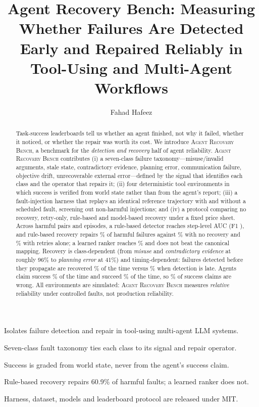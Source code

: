 \documentclass[review,12pt]{elsarticle}
\newcommand{\arb}{\textsc{Agent Recovery Bench}}
\begin{document}
\begin{frontmatter}

\title{Agent Recovery Bench: Measuring Whether Failures Are Detected Early and
Repaired Reliably in Tool-Using and Multi-Agent Workflows}

\author[ncl]{Fahad Hafeez}

\begin{abstract}
Task-success leaderboards tell us whether an agent finished, not why it failed, whether it
noticed, or whether the repair was worth its cost. We introduce \arb{}, a benchmark for the
\emph{detection and recovery} half of agent reliability. \arb{} contributes (i) a seven-class
failure taxonomy---misuse/invalid arguments, stale state, contradictory evidence, planning error,
communication failure, objective drift, unrecoverable external error---defined by the signal that
identifies each class and the operator that repairs it; (ii) four deterministic tool environments
in which success is verified from world state rather than from the agent's report; (iii) a
fault-injection harness that replays an identical reference trajectory with and without a
scheduled fault, screening out non-harmful injections; and (iv) a protocol comparing no recovery,
retry-only, rule-based and model-based recovery under a fixed price sheet. Across \NumHarmful{}
harmful pairs and \NumEpisodes{} episodes, a rule-based detector reaches step-level AUC
\AucRules{} (F1 \RulesFone{}), and rule-based recovery repairs \RecRules\% of harmful failures
against \RecNoRecovery\% with no recovery and \RecRetry\% with retries alone; a learned ranker
reaches \RecModel\% and does not beat the canonical mapping. Recovery is class-dependent (from
\emph{misuse} and \emph{contradictory evidence} at roughly 96\% to \emph{planning error} at
41\%) and timing-dependent: failures detected before they propagate are recovered \EarlyRec\% of
the time versus \LateRec\% when detection is late. Agents claim success \ClaimedPct\% of the
time and succeed \VerifiedPct\% of the time, so \FalseClaimPct\% of success claims are wrong. All
environments are simulated: \arb{} measures \emph{relative} reliability under controlled faults,
not production reliability.
\end{abstract}

\begin{highlights}
\item Isolates failure detection and repair in tool-using multi-agent LLM systems.
\item Seven-class fault taxonomy ties each class to its signal and repair operator.
\item Success is graded from world state, never from the agent's success claim.
\item Rule-based recovery repairs 60.9\% of harmful faults; a learned ranker does not.
\item Harness, dataset, models and leaderboard protocol are released under MIT.
\end{highlights}


\end{frontmatter}
\end{document}
